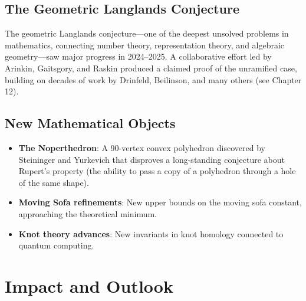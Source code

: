 \subsection{The Geometric Langlands Conjecture}
The geometric Langlands conjecture---one of the deepest unsolved problems in mathematics, connecting number theory, representation theory, and algebraic geometry---saw major progress in 2024--2025. A collaborative effort led by Arinkin, Gaitsgory, and Raskin produced a claimed proof of the unramified case, building on decades of work by Drinfeld, Beilinson, and many others (see Chapter 12).

\subsection{New Mathematical Objects}
\begin{itemize}
\item \textbf{The Noperthedron}: A 90-vertex convex polyhedron discovered by Steininger and Yurkevich that disproves a long-standing conjecture about Rupert's property (the ability to pass a copy of a polyhedron through a hole of the same shape).
\item \textbf{Moving Sofa refinements}: New upper bounds on the moving sofa constant, approaching the theoretical minimum.
\item \textbf{Knot theory advances}: New invariants in knot homology connected to quantum computing.
\end{itemize}

\section{Impact and Outlook}

